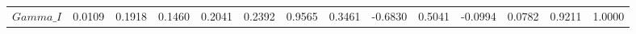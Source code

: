 \begin{center}
\begin{longtable}{lccccccccccccc}
$Gamma\_I        $	 & 	            0.0109	 & 	            0.1918	 & 	            0.1460	 & 	            0.2041	 & 	            0.2392	 & 	            0.9565	 & 	            0.3461	 & 	           -0.6830	 & 	            0.5041	 & 	           -0.0994	 & 	            0.0782	 & 	            0.9211	 & 	            1.0000 \\ 
\end{longtable}
 \end{center}
